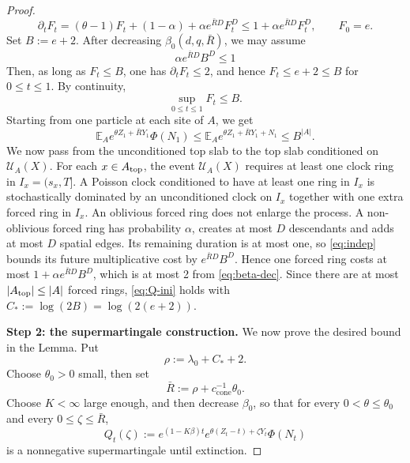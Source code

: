 \documentclass[letterpaper,11pt,reqno]{amsart}
\theoremstyle{definition}
\begin{document}
\begin{proof}
\[
        \partial_tF_t
        =
        (\theta-1)F_t
        +(1-\alpha)
        +\alpha e^{\bar R D}F_t^D
        \le
        1+\alpha e^{\bar R D}F_t^D ,
        \qquad
        F_0=e .
\]
Set \(B:=e+2\). After decreasing \(\beta_0(d,q,\bar R)\), we may
assume
\begin{equation}\label{eq:beta-dec}
    \alpha e^{\bar R D}B^D\le1
\end{equation}
Then, as long as \(F_t\le B\), one has \(\partial_tF_t\le2\), and hence
\(F_t\le e+2\leq B\) for \(0\le t\le1\). By continuity,
\[
        \sup_{0\le t\le1}F_t\le B .
\]
Starting from one particle at each site of \(A\), we get
\begin{equation}\label{eq:indep}
        \mathbb E_A e^{\theta Z_1+\bar RY_1}\Phi(N_1)
        \le
        \mathbb E_A e^{\theta Z_1+\bar RY_1+N_1}
        \le B^{|A|}.
\end{equation}
We now pass from the unconditioned top slab to the top slab conditioned on
\(\mathcal U_A(X)\). For each \(x\in A_{\rm top}\), the event
\(\mathcal U_A(X)\) requires at least one clock ring in \(I_x=(s_x,T]\). A
Poisson clock conditioned to have at least one ring in \(I_x\) is stochastically
dominated by an unconditioned clock on \(I_x\) together with one extra forced
ring in \(I_x\). 
An oblivious forced ring does not enlarge the process. A non-oblivious
forced ring has probability \(\alpha\), creates at most \(D\) descendants and adds at most \(D\) spatial edges. Its remaining duration is at most one, so \eqref{eq:indep} bounds its future multiplicative cost by \(e^{\bar R D}B^D\). Hence one
forced ring costs at most $1+\alpha e^{\bar R D}B^D$, which is at most 2 from \eqref{eq:beta-dec}. Since
there are at most \(|A_{\rm top}|\le |A|\) forced rings, \eqref{eq:Q-ini} holds with $C_*:=\log (2B)=\log(2(e+2))$.


\smallskip
\noindent\textbf{Step 2: the supermartingale construction.}
We now prove the desired bound in the Lemma. Put
\[
        \rho:=\lambda_0+C_*+2 .
\]
Choose \(\theta_0>0\) small, then set
\[
        \bar R:=\rho+c_{\mathrm{cone}}^{-1}\theta_0 .
\]
Choose \(K<\infty\) large enough, and then decrease \(\beta_0\), so that for
every \(0<\theta\le\theta_0\) and every \(0\le\zeta\le\bar R\),
\[
        Q_t(\zeta):=
        e^{(1-K\beta)t}
        e^{\theta(Z_t-t)+\zeta Y_t}\Phi(N_t)
\]
is a nonnegative supermartingale until extinction.


\end{proof}
\end{document}
